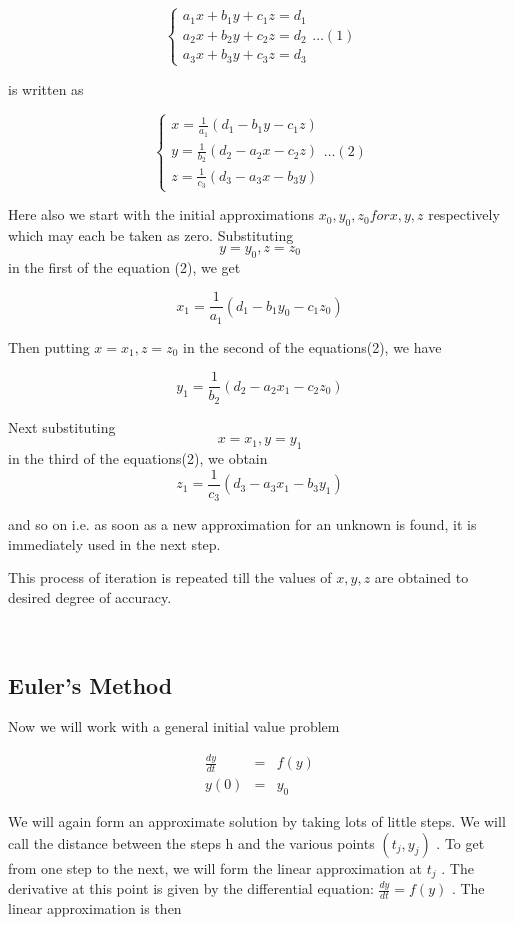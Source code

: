 $$\begin{cases}a_1x+b_1y+c_1z=d_1\\a_2x+b_2y+c_2z=d_2\\a_3x+b_3y+c_3z=d_3\end{cases}\ldots(1)$$

is written as

$$\begin{cases}x=\frac{1}{a_1}(d_1-b_1y-c_1z)\\y=\frac{1}{b_2}(d_2-a_2x-c_2z)\\z=\frac{1}{c_3}(d_3-a_3x-b_3y)\end{cases}\ldots(2)$$

Here also we start with the initial approximations $x_0,y_0,z_0$$ for $$x,y,z$ respectively which may each be taken as zero. Substituting $$y=y_0, z=z_0$$ in the first of the equation (2), we get

$$x_1=\frac{1}{a_1}(d_1-b_1y_0-c_1z_0)$$

Then putting $x=x_1, z=z_0$ in the second of the equations(2), we have

$$y_1=\frac{1}{b_2}(d_2-a_2x_1-c_2z_0)$$

Next substituting $$x=x_1, y=y_1$$ in the third of the equations(2), we obtain
$$z_1=\frac{1}{c_3}(d_3-a_3x_1-b_3y_1)$$

and so on i.e. as soon as a new approximation for an unknown is found, it is immediately used in the next step.

This process of iteration is repeated till the values of $x,y,z$ are obtained to desired degree of accuracy.


\
\
\subsection{Euler's Method}
Now we will work with a general initial value problem

\begin{eqnarray*} \frac{dy}{dt} & = & f(y) \\ y(0) & = & y_0 \end{eqnarray*}

We will again form an approximate solution by taking lots of little steps. We will call the distance between the steps h and the various points $ (t_j, y_j) $ . To get from one step to the next, we will form the linear approximation at $ t_j $ . The derivative at this point is given by the differential equation: $ \frac{dy}{dt} = f(y) $ . The linear approximation is then

